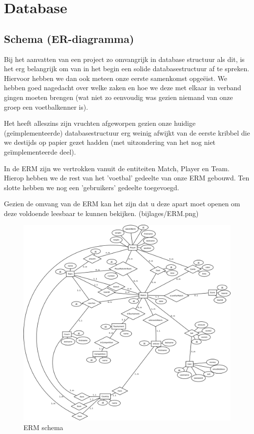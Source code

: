\documentclass[11pt]{article}
\begin{document}
\section{Database}

\subsection{Schema (ER-diagramma)}

Bij het aanvatten van een project zo omvangrijk in database structuur als dit, is het erg belangrijk om van in het begin een solide databasestructuur af te spreken.
Hiervoor hebben we dan ook meteen onze eerste samenkomst opge{\"e}ist.  We hebben goed nagedacht over welke zaken en hoe we deze met elkaar in verband gingen moeten brengen (wat niet zo eenvoudig was gezien niemand van onze groep een voetbalkenner is).

Het heeft alleszins zijn vruchten afgeworpen gezien onze huidige (ge{\"i}mplementeerde) databasestructuur erg weinig afwijkt van de eerste kribbel die we destijds op papier gezet hadden (met uitzondering van het nog niet ge{\"i}mplementeerde deel).

In de ERM zijn we vertrokken vanuit de entiteiten Match, Player en Team.  Hierop hebben we de rest van het 'voetbal' gedeelte van onze ERM gebouwd.  Ten slotte hebben we nog een 'gebruikers' gedeelte toegevoegd.

Gezien de omvang van de ERM kan het zijn dat u deze apart moet openen om deze voldoende leesbaar te kunnen bekijken.  (bijlages/ERM.png)


\begin{figure}[h!]
	\begin{center}
	\includegraphics[scale=0.11]{ERM.png}

	\caption{ERM schema}
	\label{fig:speler}
	\end{center}
\end{figure}
\end{document}
